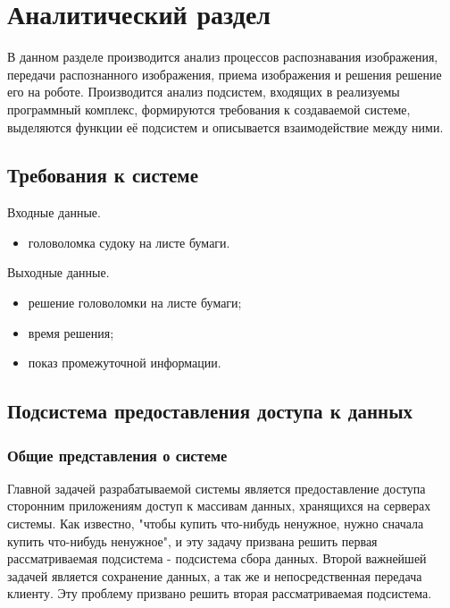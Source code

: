\chapter{Аналитический раздел}
\label{cha:analysis}
%
%
В данном разделе производится анализ процессов распознавания изображения, передачи распознанного изображения, приема изображения и  решения решение его на роботе.
Производится анализ подсистем, входящих в реализуемы программный комплекс, формируются требования к создаваемой системе, выделяются функции её подсистем и описывается взаимодействие между ними.

\section{Требования к системе}

Входные данные.
\begin{itemize}
\item головоломка судоку на листе бумаги.
\end{itemize}

Выходные данные.
\begin{itemize}
\item решение головоломки на листе бумаги;
\item время решения;
\item показ промежуточной информации.
\end{itemize}


\section{Подсистема предоставления доступа к данных}

\subsection{Общие представления о системе}

Главной задачей разрабатываемой системы является предоставление доступа сторонним приложениям доступ к массивам данных, хранящихся на серверах системы. Как известно, "чтобы купить что-нибудь ненужное, нужно сначала купить что-нибудь ненужное", и эту задачу призвана решить первая рассматриваемая подсистема - подсистема сбора данных. Второй важнейшей задачей является сохранение данных, а так же и непосредственная передача клиенту. Эту проблему призвано решить вторая рассматриваемая подсистема.

